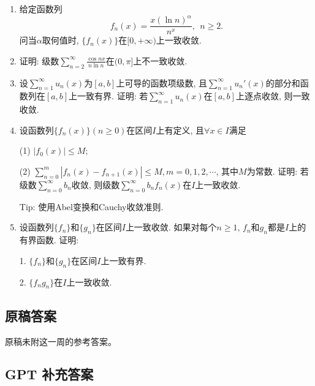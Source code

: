\documentclass[UTF8,11pt, a4paper, oneside, fontset=none]{ctexbook}
\begin{document}
\begin{enumerate}


\item 给定函数列
\[
f_n(x) = \frac{x (\ln n)^{\alpha}}{n^x}, \ \ n \geq 2.
\]
问当$\alpha$取何值时, $\{ f_n(x) \}$在$[0, +\infty)$上一致收敛.


\item 证明: 级数$\sum_{n=2}^{\infty} \frac{\cos nx}{n \ln n}$在$(0, \pi]$上不一致收敛.



\item 设$\sum_{n=1}^{\infty} u_n(x)$为$[a, b]$上可导的函数项级数, 且$\sum_{n=1}^{\infty} u_n'(x)$的部分和函数列在$[a, b]$上一致有界. 证明: 若$\sum_{n=1}^{\infty} u_n(x)$在$[a, b]$上逐点收敛, 则一致收敛.


\item 设函数列$\{f_n(x) \} (n \geq 0)$在区间$I$上有定义, 且$\forall x \in I$满足

(1) $|f_0(x)| \leq M$;

(2) $\sum_{n=0}^m |f_n(x) - f_{n+1}(x)| \leq M, m = 0, 1, 2, \cdots$, 其中$M$为常数. 证明: 若级数$\sum_{n=0}^{\infty} b_n$收敛, 则级数$\sum_{n=0}^{\infty} b_n f_n(x)$在$I$上一致收敛.


Tip: 使用Abel变换和Cauchy收敛准则.

\item 设函数列$\{ f_n \}$和$\{ g_n \}$在区间$I$上一致收敛. 如果对每个$n \geq 1$, $f_n$和$g_n$都是$I$上的有界函数. 证明:

1. $\{ f_n \}$和$\{ g_n \}$在区间$I$上一致有界.

2. $\{ f_n g_n \}$在$I$上一致收敛.

\end{enumerate}

\clearpage

\subsection*{原稿答案}

\noindent 原稿未附这一周的参考答案。

\clearpage

\subsection*{GPT 补充答案}
\end{document}
